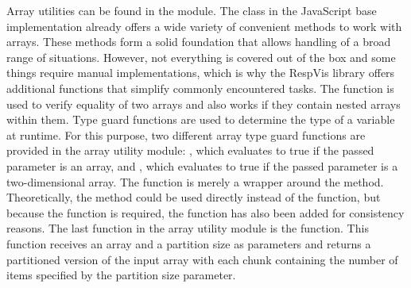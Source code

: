 Array utilities can be found in the  module.
The  class in the JavaScript base implementation already offers a wide variety of convenient methods to work with arrays.
These methods form a solid foundation that allows handling of a broad range of situations.
However, not everything is covered out of the box and some things require manual implementations, which is why the RespVis library offers additional functions that simplify commonly encountered tasks.
The  function is used to verify equality of two arrays and also works if they contain nested arrays within them.
Type guard functions are used to determine the type of a variable at runtime.
For this purpose, two different array type guard functions are provided in the array utility module: , which evaluates to true if the passed parameter is an array, and , which evaluates to true if the passed parameter is a two-dimensional array.
The  function is merely a wrapper around the  method.
Theoretically, the  method could be used directly instead of the  function, but because the  function is required, the  function has also been added for consistency reasons.
The last function in the array utility module is the  function.
This function receives an array and a partition size as parameters and returns a partitioned version of the input array with each chunk containing the number of items specified by the partition size parameter.



